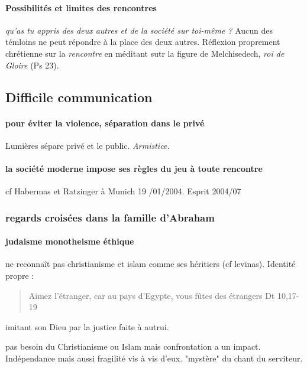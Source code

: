 \paragraph{Possibilités et limites des rencontres } \textit{qu'as tu appris des deux autres et de la société sur toi-même ? } Aucun des témloins ne peut répondre à la place des deux autres.
Réflexion proprement chrétienne sur la \textit{rencontre} en méditant sutr la figure de Melchisedech, \textit{roi de Gloire} (Ps 23).

\subsection{Difficile communication}

\paragraph{pour éviter la violence, séparation dans le privé} Lumières sépare privé et le public.  \textit{Armistice. } 

\paragraph{la société moderne impose ses règles du jeu à toute rencontre} cf Habermas et Ratzinger à Munich 19 /01/2004.  Esprit 2004/07

\subsubsection{regards croisées dans la famille d'Abraham}

\paragraph{judaisme monotheisme éthique} ne reconnaît pas christianisme et islam comme ses héritiers (cf levinas). Identité propre :
\begin{quote}
    Aimez l'étranger, car au pays d'Egypte, vous fûtes des étrangers Dt 10,17-19
\end{quote}
imitant son Dieu par la justice faite à autrui.


pas besoin du Christianisme ou Islam mais confrontation a un impact. Indépendance mais aussi fragilité vis à vis d'eux. "mystère" du chant du serviteur.  

